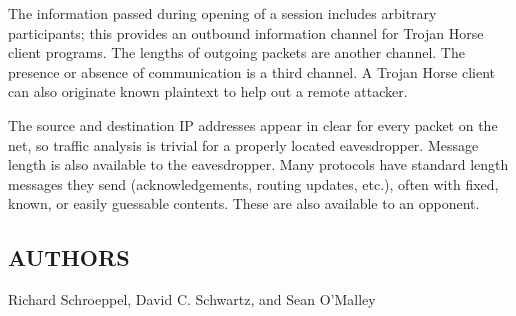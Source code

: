 The information passed during opening of a session includes
arbitrary participants; this provides an outbound information
channel for Trojan Horse client programs.  The lengths of outgoing
packets are another channel.  The presence or absence of communication
is a third channel.  A Trojan Horse client can also originate known
plaintext to help out a remote attacker.

The source and destination IP addresses appear in clear for every
packet on the net, so traffic analysis is trivial for a properly
located eavesdropper.  Message length is also available to the
eavesdropper.  Many protocols have standard length messages they send
(acknowledgements, routing updates, etc.), often with fixed, known, or
easily guessable contents.  These are also available to an opponent.

\subsection*{AUTHORS}

\noindent Richard Schroeppel, David C. Schwartz, and  Sean O'Malley
